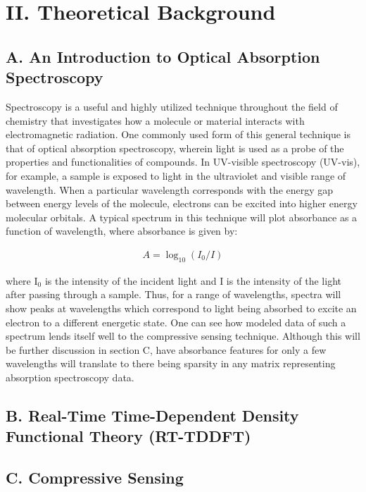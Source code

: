 \documentclass[11pt]{article}
\begin{document}

\section*{II.	Theoretical Background}	%
\subsection*{A.	An Introduction to Optical Absorption Spectroscopy} %

Spectroscopy is a useful and highly utilized technique throughout the field of chemistry that investigates how a molecule or material interacts with electromagnetic radiation. One commonly used form of this general technique is that of optical absorption spectroscopy, wherein light is used as a probe of the properties and functionalities of compounds. In UV-visible spectroscopy (UV-vis), for example, a sample is exposed to light in the ultraviolet and visible range of wavelength. When a particular wavelength corresponds with the energy gap between energy levels of the molecule, electrons can be excited into higher energy molecular orbitals. A typical spectrum in this technique will plot absorbance as a function of wavelength, where absorbance is given by:

\begin{align}
A = \log_{10}{(I_0/I)}
\end{align}

where I$_0$ is the intensity of the incident light and I is the intensity of the light after passing through a sample. Thus, for a range of wavelengths, spectra will show peaks at wavelengths which correspond to light being absorbed to excite an electron to a different energetic state. One can see how modeled data of such a spectrum lends itself well to the compressive sensing technique. Although this will be further discussion in section C, have absorbance features for only a few wavelengths will translate to there being sparsity in any matrix representing absorption spectroscopy data. 

\subsection*{B.	Real-Time Time-Dependent Density Functional Theory (RT-TDDFT)} 

\subsection*{C.	Compressive Sensing}	%
\end{document}
